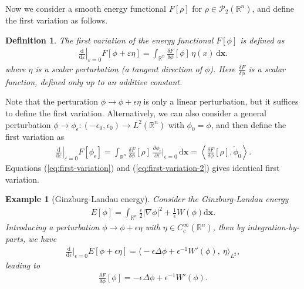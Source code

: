 \documentclass[11pt]{book}
\newtheorem{definition}[theorem]{Definition}
\newtheorem{example}[theorem]{Example}
\newcommand{\R}{\mathbb{R}}
\newcommand{\bx}{\mathbf x}
\newcommand{\dd}{\mathrm{d}}
\begin{document}
Now we consider a smooth energy functional $F[\rho]$ for $\rho \in \mathcal{P}_2(\mathbb{R}^n)$, and define the first variation as follows.

\begin{definition}
    The first variation of the energy functional $F[\phi]$ is defined as
    \begin{align}\label{eq:first-variation}
        \left.\frac{\dd}{\dd\varepsilon}\right|_{\varepsilon=0} F[\phi+\varepsilon\eta]
        = \int_{\R^n} \frac{\delta F}{\delta \phi}[\phi]\,\eta(x)\,\dd \bx.
    \end{align}
    where $\eta$ is a scalar perturbation (a tangent direction of $\phi$). Here $\frac{\delta F}{\delta \phi}$ is a scalar function, defined only up to an additive constant.
\end{definition}

Note that the perturation $\phi \rightarrow \phi+\epsilon\eta$ is only a linear perturbation, but it suffices to define the first variation. Alternatively, we can also consider a general perturbation $\phi \rightarrow \phi_{\epsilon}:(-\epsilon_0,\epsilon_0)\rightarrow L^2(\mathbb{R}^n)$ with $\phi_0 = \phi$, and then define the first variation as
    \begin{align}\label{eq:first-variation-2}
        \left.\frac{\dd}{\dd\varepsilon}\right|_{\varepsilon=0} F[\phi_{\epsilon}]
        = \int_{\R^n} \frac{\delta F}{\delta \phi}[\rho]\, \frac{\partial \phi_\epsilon}{\partial \epsilon} \bigg|_{\epsilon=0}\,\dd \bx 
        = \left\langle  \frac{\delta F}{\delta \phi}[\rho],  \dot{\phi}_0\right\rangle. 
    \end{align}
Equations (\ref{eq:first-variation}) and (\ref{eq:first-variation-2}) gives identical first variation.


\begin{example}[Ginzburg-Landau energy]
    Consider the Ginzburg-Landau energy 
    \begin{align}
        E[\phi] = \int_{\mathbb{R}^n} \frac{\epsilon}{2}|\nabla\phi|^2 + \frac{1}{\epsilon}W(\phi) \dd \bx.
    \end{align}
    Introducing a perturbation $\phi \rightarrow \phi+\epsilon \eta$ with $\eta \in C_c^{\infty}(\mathbb{R}^n)$, then by integration-by-parts, we have
    \begin{align*}
        \frac{\dd}{\dd \epsilon} \Big|_{\epsilon = 0} E[\phi+\epsilon\eta] = \Big\langle -\epsilon\Delta\phi + \epsilon^{-1}W'(\phi), \ \eta \Big\rangle_{L^2},
    \end{align*}
    leading to 
    \begin{align*}
        \frac{\delta F}{\delta \phi}[\phi] = -\epsilon\Delta\phi + \epsilon^{-1}W'(\phi).
    \end{align*}
\end{example}
\end{document}
